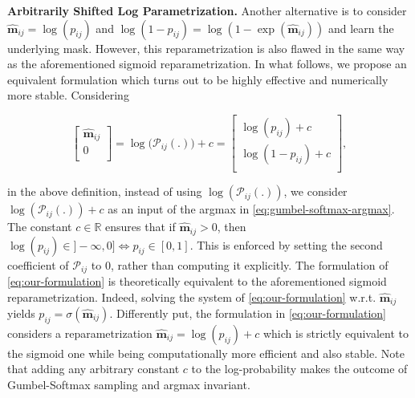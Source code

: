   

\noindent\textbf{Arbitrarily Shifted Log Parametrization.}
Another alternative is to consider $\bm{\hat{m}}_{ij} =
\log(p_{ij})$ and $\log(1-p_{ij}) = \log(1-\exp(\bm{\hat{m}}_{ij}))$ and learn
the underlying mask. However, this reparametrization is also flawed in the
same way as the aforementioned sigmoid reparametrization. In what follows, we
propose an equivalent formulation which turns out to be highly effective and
numerically more stable. Considering  

\begin{equation}
  \begin{bmatrix}
    \bm{\hat{m}}_{ij} \\
    0  \\
  \end{bmatrix}
  = \log\big(\mathcal{P}_{ij}(.)\big) + c =
  \begin{bmatrix}
    \log(p_{ij}) + c \\
    \log(1-p_{ij}) + c\\
  \end{bmatrix},
  \label{eq:our-formulation}
\end{equation}

\noindent in the above definition, instead of using $\log(\mathcal{P}_{ij}(.))$, we
consider $\log(\mathcal{P}_{ij}(.)) + c$  as an input of the argmax in
\cref{eq:gumbel-softmax-argmax}. The constant $c \in \mathds{R}$ ensures that
if $\bm{\hat{m}}_{ij} > 0$, then $\log(p_{ij}) \in ]-\infty,0] \Leftrightarrow
p_{ij} \in [0,1]$. This is enforced by setting the second coefficient of
$\mathcal{P}_{ij}$ to 0, rather than computing it explicitly. The formulation
of \cref{eq:our-formulation} is theoretically equivalent to the aforementioned
sigmoid reparametrization. Indeed, solving the system of
\cref{eq:our-formulation} w.r.t. $\bm{\hat{m}}_{ij}$ yields $p_{ij} =
\sigma(\bm{\hat{m}}_{ij})$. \noindent Differently put, the formulation in
\cref{eq:our-formulation} considers a reparametrization $\bm{\hat{m}}_{ij} =
\log(p_{ij})+c$ which is strictly equivalent to the sigmoid one while being
computationally more efficient and also stable. Note that adding any arbitrary constant $c$ to the log-probability
makes the outcome of Gumbel-Softmax sampling and argmax invariant.


